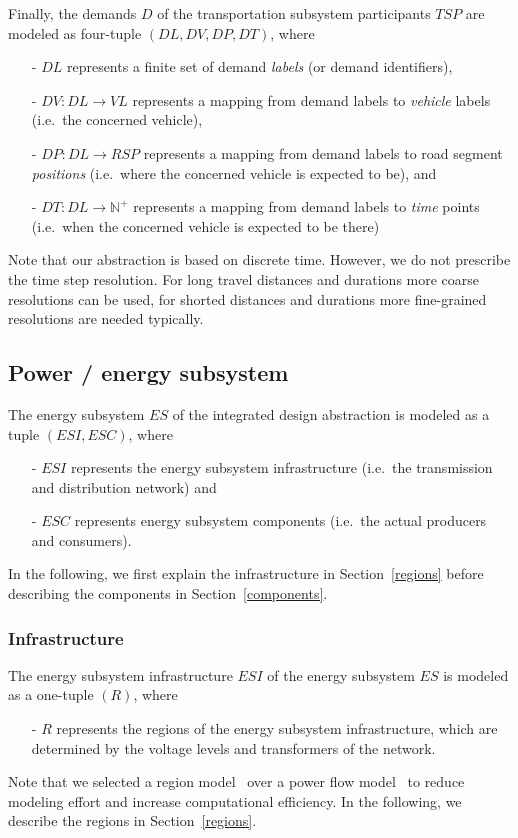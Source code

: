 Finally, the demands $D$ of the transportation subsystem participants $TSP$ are modeled as four-tuple $(DL, DV, DP, DT)$, where
\begin{itemize}
	\item[-] $DL$ represents a finite set of demand \textit{labels} (or demand identifiers),
	\item[-] $DV: DL \rightarrow VL$ represents a mapping from demand labels to \textit{vehicle} labels (i.e.\ the concerned vehicle),
	\item[-] $DP: DL \rightarrow RSP$ represents a mapping from demand labels to road segment \textit{positions} (i.e.\ where the concerned vehicle is expected to be), and
	\item[-] $DT: DL \rightarrow \mathbb{N}^+$ represents a mapping from demand labels to \textit{time} points (i.e.\ when the concerned vehicle is expected to be there)
\end{itemize}
Note that our abstraction is based on discrete time. However, we do not prescribe the time step resolution. For long travel distances and durations more coarse resolutions can be used, for shorted distances and durations more fine-grained resolutions are needed typically.

\subsection{Power / energy subsystem}
\label{energy_system}

The energy subsystem $ES$ of the integrated design abstraction is modeled as a tuple $(ESI, ESC)$, where
\begin{itemize}
	\item[-] $ESI$ represents the energy subsystem infrastructure (i.e.\ the transmission and distribution network) and
	\item[-] $ESC$ represents energy subsystem components (i.e.\ the actual producers and consumers).
\end{itemize}
In the following, we first explain the infrastructure in Section~\ref{regions} before describing the components in Section~\ref{components}.

\subsubsection{Infrastructure}
\label{energy_infrastructure}

The energy subsystem infrastructure $ESI$ of the energy subsystem $ES$ is modeled as a one-tuple $(R)$, where
\begin{itemize}
	\item[-] $R$ represents the regions of the energy subsystem infrastructure, which are determined by the voltage levels and transformers of the network.
\end{itemize}
Note that we selected a region model~\cite{Hackenberg2012} over a power flow model~\cite{Dommel1968} to reduce modeling effort and increase computational efficiency. In the following, we describe the regions in Section~\ref{regions}.


